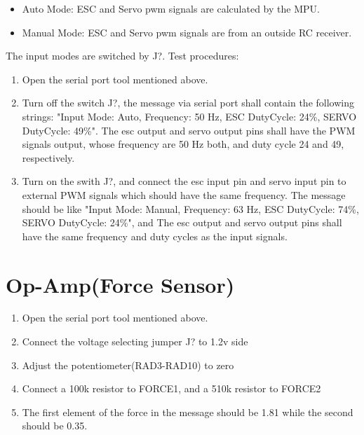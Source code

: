 \documentclass{article}
\begin{document}
\begin{itemize}
    \item Auto Mode: ESC and Servo pwm signals are calculated by the MPU.
    \item Manual Mode: ESC and Servo pwm signals are from an outside RC receiver.
\end{itemize} 
The input modes are switched by J?.
Test procedures:
\begin{enumerate}
    \item Open the serial port tool mentioned above. 
    \item Turn off the switch J?, the message via serial port shall contain the following strings: "Input Mode: Auto, Frequency: 50 Hz, ESC DutyCycle: 24\%, SERVO DutyCycle: 49\%". The esc output and servo output pins shall have the PWM signals output, whose frequency are 50 Hz both, and duty cycle 24 and 49, respectively.
    \item Turn on the swith J?, and connect the esc input pin and servo input pin to external PWM signals which should have the same frequency. The message should be like "Input Mode: Manual, Frequency: 63 Hz, ESC DutyCycle: 74\%, SERVO DutyCycle: 24\%", and The esc output and servo output pins shall have the same frequency and duty cycles as the input signals.
\end{enumerate}

\section{Op-Amp(Force Sensor)}
\begin{enumerate}
    \item Open the serial port tool mentioned above. 
    \item Connect the voltage selecting jumper J? to 1.2v side
    \item Adjust the potentiometer(RAD3-RAD10) to zero
    \item Connect a 100k resistor to FORCE1, and a 510k resistor to FORCE2
    \item The first element of the force in the message should be 1.81 while the second should be 0.35. 

\end{enumerate}
\end{document}
